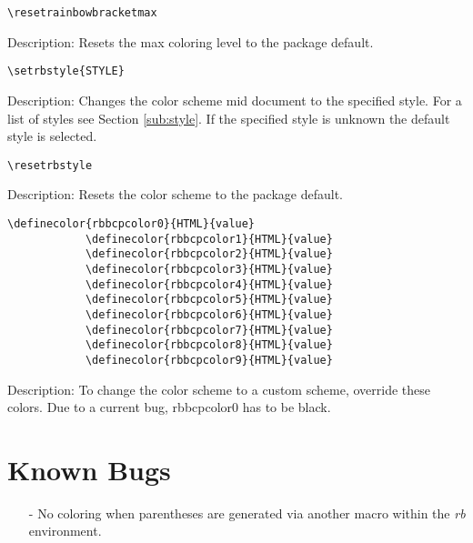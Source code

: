 \documentclass[10pt, a4paper]{article}
\newenvironment{itemizeexamplecommand}{
	\begin{itemize}
		\setlength\itemsep{-0.2em}
	}
	{
	\end{itemize}
}
\begin{document}
	\xe
	\pex\begin{itemizeexamplecommand}
		\item[] \begin{lstlisting}[style=B]
			\resetrainbowbracketmax
		\end{lstlisting}
		{\scriptsize
			\item[] Description: Resets the max coloring level to the package default.}
	\end{itemizeexamplecommand}
	\xe
	\pex\begin{itemizeexamplecommand}
		\item[] \begin{lstlisting}[style=B]
			\setrbstyle{STYLE}
		\end{lstlisting}
		{\scriptsize
			\item[] Description: Changes the color scheme mid document to the specified style. For a list of styles see Section \ref{sub:style}. If the specified style is unknown the default style is selected.}
	\end{itemizeexamplecommand}
	\xe
	\pex\begin{itemizeexamplecommand}
		\item[] \begin{lstlisting}[style=B]
			\resetrbstyle
		\end{lstlisting}
		{\scriptsize
			\item[] Description: Resets the color scheme to the package default.}
	\end{itemizeexamplecommand}
	\xe
	\pex\begin{itemizeexamplecommand}
		\item[] \begin{lstlisting}[style=B]
			\definecolor{rbbcpcolor0}{HTML}{value}
			\definecolor{rbbcpcolor1}{HTML}{value}
			\definecolor{rbbcpcolor2}{HTML}{value}
			\definecolor{rbbcpcolor3}{HTML}{value}
			\definecolor{rbbcpcolor4}{HTML}{value}
			\definecolor{rbbcpcolor5}{HTML}{value}
			\definecolor{rbbcpcolor6}{HTML}{value}
			\definecolor{rbbcpcolor7}{HTML}{value}
			\definecolor{rbbcpcolor8}{HTML}{value}
			\definecolor{rbbcpcolor9}{HTML}{value}
		\end{lstlisting}
		{\scriptsize
			\item[] Description: To change the color scheme to a custom scheme, override these colors. Due to a current bug, rbbcpcolor0 has to be black.}
	\end{itemizeexamplecommand}
	\xe
	\section{Known Bugs}
	\begin{enumerate}
		\item[-] No coloring when parentheses are generated via another macro within the \textit{rb} environment.
	\end{enumerate}
\end{document}
